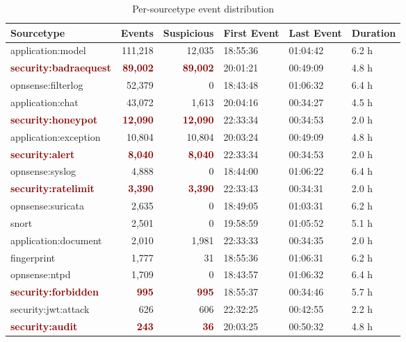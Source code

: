 \begin{table}[hbtp]
\caption{Per-sourcetype event distribution}
\label{tab:export_22Dec2025_010633_sourcetype}
\centering
\scriptsize
\begin{tabular}{|l|r|r|l|l|l|}
\hline
\textbf{Sourcetype} & \textbf{Events} & \textbf{Suspicious} & \textbf{First Event} & \textbf{Last Event} & \textbf{Duration} \\
\hline
application:model & 111,218 & 12,035 & 18:55:36 & 01:04:42 & 6.2 h \\
\textcolor{darkred}{\textbf{security:badraequest}} & \textcolor{darkred}{\textbf{89,002}} & \textcolor{darkred}{\textbf{89,002}} & 20:01:21 & 00:49:09 & 4.8 h \\
opnsense:filterlog & 52,379 & 0 & 18:43:48 & 01:06:32 & 6.4 h \\
application:chat & 43,072 & 1,613 & 20:04:16 & 00:34:27 & 4.5 h \\
\textcolor{darkred}{\textbf{security:honeypot}} & \textcolor{darkred}{\textbf{12,090}} & \textcolor{darkred}{\textbf{12,090}} & 22:33:34 & 00:34:53 & 2.0 h \\
application:exception & 10,804 & 10,804 & 20:03:24 & 00:49:09 & 4.8 h \\
\textcolor{darkred}{\textbf{security:alert}} & \textcolor{darkred}{\textbf{8,040}} & \textcolor{darkred}{\textbf{8,040}} & 22:33:34 & 00:34:53 & 2.0 h \\
opnsense:syslog & 4,888 & 0 & 18:44:00 & 01:06:22 & 6.4 h \\
\textcolor{darkred}{\textbf{security:ratelimit}} & \textcolor{darkred}{\textbf{3,390}} & \textcolor{darkred}{\textbf{3,390}} & 22:33:43 & 00:34:31 & 2.0 h \\
opnsense:suricata & 2,635 & 0 & 18:49:05 & 01:03:31 & 6.2 h \\
snort & 2,501 & 0 & 19:58:59 & 01:05:52 & 5.1 h \\
application:document & 2,010 & 1,981 & 22:33:33 & 00:34:35 & 2.0 h \\
fingerprint & 1,777 & 31 & 18:55:36 & 01:06:31 & 6.2 h \\
opnsense:ntpd & 1,709 & 0 & 18:43:57 & 01:06:32 & 6.4 h \\
\textcolor{darkred}{\textbf{security:forbidden}} & \textcolor{darkred}{\textbf{995}} & \textcolor{darkred}{\textbf{995}} & 18:55:37 & 00:34:46 & 5.7 h \\
security:jwt:attack & 626 & 606 & 22:32:25 & 00:42:55 & 2.2 h \\
\textcolor{darkred}{\textbf{security:audit}} & \textcolor{darkred}{\textbf{243}} & \textcolor{darkred}{\textbf{36}} & 20:03:25 & 00:50:32 & 4.8 h \\

\end{tabular}
\end{table}
